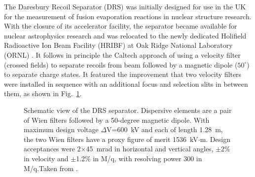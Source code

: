 The Daresbury Recoil Separator (DRS) was initially designed for use in the UK for the measurement of fusion evaporation reactions in nuclear structure research. With the closure of its accelerator facility, the separator became available for nuclear astrophysics research and was relocated to the newly dedicated Holifield Radioactive Ion Beam Facility (HRIBF) at Oak Ridge National Laboratory (ORNL) \cite{smit98}. It follows in principle the Caltech approach of using a velocity filter (crossed fields) to separate recoils from beam followed by a magnetic dipole ($50^\circ$) to separate charge states. It featured the improvement that two velocity filters were installed in sequence with an additional focus and selection slits in between them, as shown in Fig.\ \ref{fig:drs}.
\begin{figure}
\caption{Schematic view of the DRS separator. Dispersive elements are a pair of Wien filters followed by a 50-degree magnetic dipole.   With maximum design voltage $\Delta$V=600~kV and each of length 1.28~m, the two Wien filters have a proxy figure of merit 1536~kV$\cdot$m.
Design acceptances were 2$\times$45~mrad in horizontal and vertical angles, $\pm$2\% in velocity and  $\pm$1.2\% in M/q, with resolving power 300 in M/q.Taken from \cite{bard09}.}
\label{fig:drs}
\end{figure}
